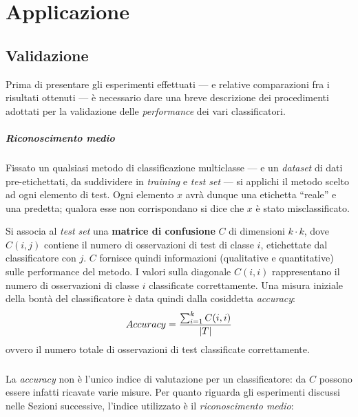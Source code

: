 %

\chapter{Applicazione}

\section{Validazione}
Prima di presentare gli esperimenti effettuati --- e relative comparazioni fra i risultati ottenuti --- è necessario dare una breve descrizione dei procedimenti adottati per la validazione delle \textit{performance} dei vari classificatori.

\paragraph{Riconoscimento medio}
Fissato un qualsiasi metodo di classificazione multiclasse --- e un \textit{dataset} di dati pre-etichettati, da suddividere in \textit{training} e \textit{test set} --- si applichi il metodo scelto ad ogni elemento di test.
Ogni elemento $x$ avrà dunque una etichetta ``reale'' e una predetta; qualora esse non corrispondano si dice che $x$ è stato misclassificato.

Si associa al \textit{test set} una \textbf{matrice di confusione} $C$ di dimensioni $k \cdot k$, dove $C(i, j)$ contiene il numero di osservazioni di test di classe $i$, etichettate dal classificatore con $j$. $C$ fornisce quindi informazioni (qualitative e quantitative) sulle performance del metodo.
I valori sulla diagonale $C(i, i)$ rappresentano il numero di osservazioni di classe $i$ classificate correttamente.
Una misura iniziale della bontà del classificatore è data quindi dalla cosiddetta \textit{accuracy}:
\begin{equation}
	Accuracy = \frac{\sum_{i=1}^{k}{C(i, i)}}{|T|}	
	\vspace{2mm}
\end{equation}
ovvero il numero totale di osservazioni di test classificate correttamente.

\paragraph{}
La \textit{accuracy} non è l'unico indice di valutazione per un classificatore: da $C$ possono essere infatti ricavate varie misure. Per quanto riguarda gli esperimenti discussi nelle Sezioni successive, l'indice utilizzato è il \textit{riconoscimento medio}:

